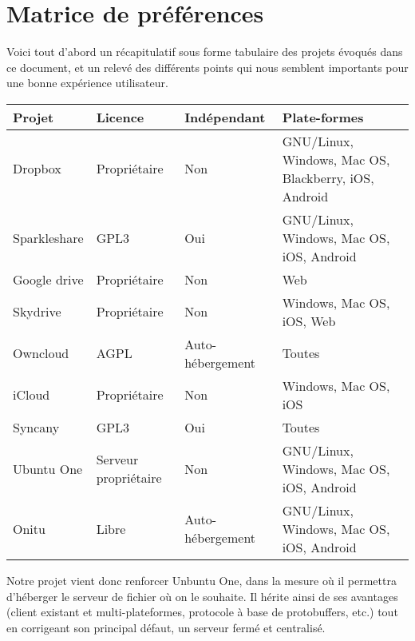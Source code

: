 \section{Matrice de préférences}
Voici tout d'abord un récapitulatif sous forme tabulaire des projets évoqués dans ce document, et un relevé des différents points qui nous semblent importants pour une bonne expérience utilisateur.\\

\begin{tabular}{|l|p{4cm}|p{4cm}|p{5cm}|}
\hline
\rowcolor{lightGray}
\rowstyle{ \color{epiBlue} \bfseries}
	Projet & Licence & Indépendant & Plate-formes \\
\hline
	Dropbox & Propriétaire & Non & GNU/Linux, Windows, Mac OS, Blackberry, iOS, Android \\
\hline
	Sparkleshare & GPL3 & Oui & GNU/Linux, Windows, Mac OS, iOS, Android \\
\hline
	Google drive & Propriétaire & Non & Web \\
\hline
	Skydrive & Propriétaire & Non & Windows, Mac OS, iOS, Web \\
\hline
	Owncloud & AGPL & Auto-hébergement & Toutes \\
\hline
	iCloud & Propriétaire & Non & Windows, Mac OS, iOS \\
\hline
	Syncany & GPL3 & Oui & Toutes \\
\hline
	Ubuntu One & Serveur propriétaire & Non & GNU/Linux, Windows, Mac OS, iOS, Android \\
\hline
	Onitu & Libre & Auto-hébergement & GNU/Linux, Windows, Mac OS, iOS, Android \\
\hline
\end{tabular}

\vspace*{10mm}

Notre projet vient donc renforcer Unbuntu One, dans la mesure où il permettra d'héberger le serveur de fichier où on le souhaite. Il hérite ainsi de ses avantages (client existant et multi-plateformes, protocole à base de protobuffers, etc.) tout en corrigeant son principal défaut, un serveur fermé et centralisé.

